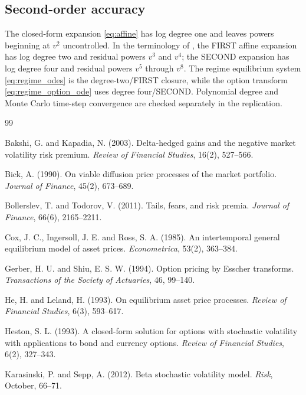 \documentclass[11pt]{article}
\theoremstyle{remark}
\begin{document}
\subsection{Second-order accuracy}
The closed-form expansion \eqref{eq:affine} has log degree one and leaves powers beginning at $v^{2}$ uncontrolled.  In the terminology of \cite{SeppRakhmonov2024}, the FIRST affine expansion has log degree two and residual powers $v^{3}$ and $v^{4}$; the SECOND expansion has log degree four and residual powers $v^{5}$ through $v^{8}$.  The regime equilibrium system \eqref{eq:regime_odes} is the degree-two/FIRST closure, while the option transform \eqref{eq:regime_option_ode} uses degree four/SECOND.  Polynomial degree and Monte Carlo time-step convergence are checked separately in the replication.

\begin{thebibliography}{99}

 Bakshi, G. and Kapadia, N. (2003). Delta-hedged gains and the negative market volatility risk premium. \textit{Review of Financial Studies}, 16(2), 527--566.

 Bick, A. (1990). On viable diffusion price processes of the market portfolio. \textit{Journal of Finance}, 45(2), 673--689.

 Bollerslev, T. and Todorov, V. (2011). Tails, fears, and risk premia. \textit{Journal of Finance}, 66(6), 2165--2211.

 Cox, J. C., Ingersoll, J. E. and Ross, S. A. (1985). An intertemporal general equilibrium model of asset prices. \textit{Econometrica}, 53(2), 363--384.

 Gerber, H. U. and Shiu, E. S. W. (1994). Option pricing by Esscher transforms. \textit{Transactions of the Society of Actuaries}, 46, 99--140.

 He, H. and Leland, H. (1993). On equilibrium asset price processes. \textit{Review of Financial Studies}, 6(3), 593--617.

 Heston, S. L. (1993). A closed-form solution for options with stochastic volatility with applications to bond and currency options. \textit{Review of Financial Studies}, 6(2), 327--343.

 Karasinski, P. and Sepp, A. (2012). Beta stochastic volatility model. \textit{Risk}, October, 66--71.


\end{thebibliography}
\end{document}
